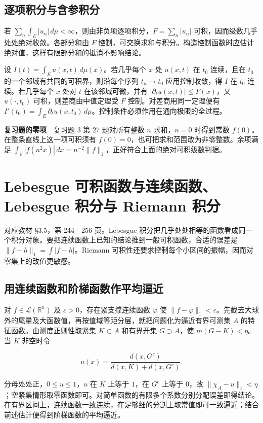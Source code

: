 \documentclass[11pt,a4paper]{article}
\begin{document}
\subsection*{逐项积分与含参积分}\label{ux9010ux9879ux79efux5206ux4e0eux542bux53c2ux79efux5206}

若 \(\sum_n\int_E|u_n|\,d\mu<\infty\)，则由非负项逐项积分，\(F=\sum_n|u_n|\) 可积，因而级数几乎处处绝对收敛。各部分和由 \(F\) 控制，可交换求和与积分。构造控制函数时应估计绝对值，这样有限部分和的抵消不影响结论。

设 \(I(t)=\int_E u(x,t)\,d\mu(x)\)。若几乎每个 \(x\) 处 \(u(x,t)\) 在 \(t_0\) 连续，且在 \(t_0\) 的一个邻域有共同的可积界，则沿每个序列 \(t_n\to t_0\) 应用控制收敛，得 \(I\) 在 \(t_0\) 连续。若几乎每个 \(x\) 处对 \(t\) 在该邻域可微，并有 \(|\partial_tu(x,t)|\le F(x)\)，又 \(u(\cdot,t_0)\) 可积，则差商由中值定理受 \(F\) 控制。对差商用同一定理便有 \(I'(t_0)=\int_E\partial_tu(x,t_0)\,d\mu\)。控制条件必须作用在通向极限的全过程。

\textbf{复习题的零项}　复习题 3 第 27 题对所有整数 \(n\) 求和，\(n=0\) 时得到常数 \(f(0)\)。在整条直线上这一项可积须有 \(f(0)=0\)，也可把求和范围改为非零整数。余项满足 \(\int_{\mathbb R}|f(n^2x)|\,dx=n^{-2}\|f\|_1\)，正好符合上面的绝对可积级数判据。

\section{Lebesgue 可积函数与连续函数、Lebesgue 积分与 Riemann 积分}
对应教材 §3.5，第 244---256 页。Lebesgue 积分把几乎处处相等的函数看成同一个积分对象。要把连续函数上已知的结论推到一般可积函数，合适的误差是 \(\|f-h\|_1=\int|f-h|\)。Riemann 可积性还要求控制每个小区间的振幅，因而对零集上的改值更敏感。

\subsection*{用连续函数和阶梯函数作平均逼近}\label{ux7528ux8fdeux7eedux51fdux6570ux548cux9636ux68afux51fdux6570ux4f5cux5e73ux5747ux903cux8fd1}

对 \(f\in\mathcal L(\mathbb R^n)\) 及 \(\varepsilon>0\)，存在紧支撑连续函数 \(\varphi\) 使 \(\|f-\varphi\|_1<\varepsilon\)。先截去大球外的尾量及大函数值，再按值域等距分层，就把问题化为逼近有界可测集 \(A\) 的特征函数。由测度正则性取紧集 \(K\subset A\) 和有界开集 \(G\supset A\)，使 \(m(G-K)<\eta\)。当 \(K\) 非空时令

\[
u(x)=\frac{d(x,G^c)}{d(x,K)+d(x,G^c)}.
\]

分母处处正，\(0\le u\le1\)，\(u\) 在 \(K\) 上等于 \(1\)，在 \(G^c\) 上等于 \(0\)，故 \(\|\chi_A-u\|_1<\eta\)；空紧集情形取零函数即可。对简单函数的有限多个系数分别分配误差即得结论。在有界区间上，连续函数一致连续，在足够细的分割上取常值即可一致逼近；结合前述估计便得到阶梯函数的平均逼近。
\end{document}
